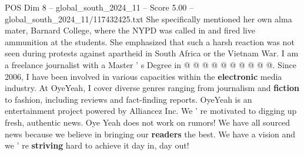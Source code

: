 \begin{textsample}{POS Dim 8 – global\_south\_2024\_11 – Score 5.00 – global\_south\_2024\_11/117432425.txt}
She specifically mentioned her own alma mater, Barnard College, where the NYPD was called in and fired live ammunition at the students.
She emphasized that such a harsh reaction was not seen during protests against apartheid in South Africa or the Vietnam War.
I am a freelance journalist with a Master ' s Degree in @ @ @ @ @ @ @ @ @ @.
Since 2006, I have been involved in various capacities within the \textbf{electronic} media industry.
At OyeYeah, I cover diverse genres ranging from journalism and \textbf{fiction} to fashion, including reviews and fact-finding reports.
OyeYeah is an entertainment project powered by Alliancez Inc.
We ' re motivated to digging up fresh, authentic news.
Oye Yeah does not work on rumors!
We have all sourced news because we believe in bringing our \textbf{readers} the best.
We have a vision and we ' re \textbf{striving} hard to achieve it day in, day out!

\end{textsample}
